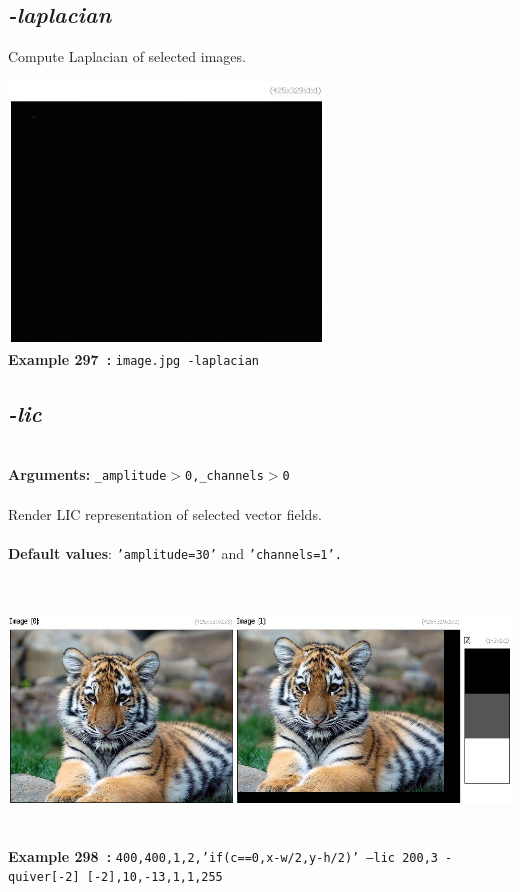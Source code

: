 \documentclass[a4paper,11pt,twoside]{book}
\begin{document}
\subsection{\emph{-laplacian} }\vspace*{-0.5em}
Compute Laplacian of selected images.
\begin{center}\includegraphics[keepaspectratio=true,height=7cm,width=\textwidth]{img/gmic_def297.jpg}\\
{\footnotesize \textbf{Example 297~:} \texttt{image.jpg -laplacian}}
\end{center}

\subsection{\emph{-lic} }\vspace*{-0.5em}
~\\\textbf{Arguments: } 
{\small \texttt{\_amplitude$>$0,\_channels$>$0}}\\~\\
Render LIC representation of selected vector fields.
~\\~\\\textbf{Default values}: {\small \texttt{'amplitude=30'} and \texttt{'channels=1'.}}
\begin{center}\includegraphics[keepaspectratio=true,height=7cm,width=\textwidth]{img/gmic_def298.jpg}\\
{\footnotesize \textbf{Example 298~:} \texttt{400,400,1,2,'if(c==0,x-w/2,y-h/2)' --lic 200,3 -quiver[-2] [-2],10,-13,1,1,255}}
\end{center}
\end{document}
